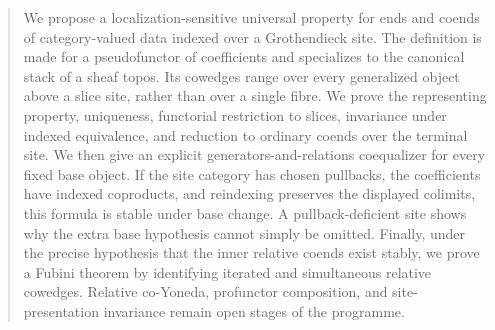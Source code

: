 


\maketitle

\begin{abstract}
We propose a localization-sensitive universal property for ends and coends of
category-valued data indexed over a Grothendieck site.  The definition is made
for a pseudofunctor of coefficients and specializes to the canonical stack of
a sheaf topos.  Its cowedges range over every generalized object above a slice
site, rather than over a single fibre.  We prove the representing property,
uniqueness, functorial restriction to slices, invariance under indexed
equivalence, and reduction to ordinary coends over the terminal site.  We then
give an explicit generators-and-relations coequalizer for every fixed base
object.  If the site category has chosen pullbacks, the coefficients have
indexed coproducts, and reindexing preserves the displayed colimits, this
formula is stable under base change.  A pullback-deficient site shows why the
extra base hypothesis cannot simply be omitted.  Finally, under the precise
hypothesis that the inner relative coends exist stably, we prove a Fubini
theorem by identifying iterated and simultaneous relative cowedges.  Relative
co-Yoneda, profunctor composition, and site-presentation invariance remain
open stages of the programme.
\end{abstract}

\tableofcontents




\enlargethispage{3\baselineskip}




